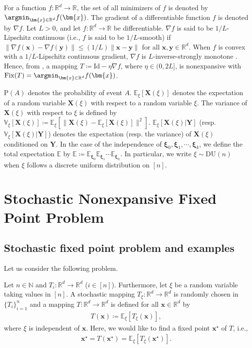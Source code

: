 \documentclass[smallextended,referee,envcountsect,]{svjour3}
\begin{document}
For a function $f \colon \mathbb{R}^d \to \mathbb{R}$, the set of all minimizers of $f$ is denoted by $\argmin_{\bm{x} \in \mathbb{R}^d} f(\bm{x})$. The gradient of a differentiable function $f$ is denoted by $\nabla f$. Let $L > 0$, and let $f \colon \mathbb{R}^d \to \mathbb{R}$ be differentiable. $\nabla f$ is said to be $1/L$-Lipschitz continuous (i.e., $f$ is said to be $1/L$-smooth) if $\|\nabla f (\bm{x}) - \nabla f (\bm{y}) \| \leq (1/L) \| \bm{x} - \bm{y} \|$ for all $\bm{x}, \bm{y} \in \mathbb{R}^d$. When $f$ is convex with a $1/L$-Lipschitz continuous gradient, $\nabla f$ is $L$-inverse-strongly monotone \cite[Th\'{e}or\`{e}me 5]{baillon1977}. Hence, from \cite[Proposition 2.3]{iiduka_JOTA}, a mapping $T \coloneqq \mathrm{Id} - \eta \nabla f$, where $\eta \in (0,2L]$, is nonexpansive with $\mathrm{Fix}(T) = \argmin_{\bm{x} \in \mathbb{R}^d} f(\bm{x})$.

$\mathrm{P}(A)$ denotes the probability of event $A$. $\mathbb{E}_\xi [\bm{X}(\xi)]$ denotes the expectation of a random variable $\bm{X}(\xi)$ with respect to a random variable $\xi$. The variance of $\bm{X}(\xi)$ with respect to $\xi$ is defined by $\mathbb{V}_\xi [\bm{X}(\xi)] \coloneqq \mathbb{E}_\xi [\| \bm{X}(\xi) - \mathbb{E}_\xi [\bm{X}(\xi)] \|^2]$. $\mathbb{E}_\xi [\bm{X}(\xi)|\bm{Y}]$ (resp. $\mathbb{V}_\xi [\bm{X}(\xi)|\bm{Y}]$) denotes the expectation (resp. the variance) of $\bm{X}(\xi)$ conditioned on $\bm{Y}$. In the case of the independence of $\bm{\xi}_0, \bm{\xi}_1, \cdots, \bm{\xi}_k$, we define the total expectation $\mathbb{E}$ by $\mathbb{E} \coloneqq \mathbb{E}_{\bm{\xi}_0} \mathbb{E}_{\bm{\xi}_1} \cdots \mathbb{E}_{\bm{\xi}_k}$. In particular, we write $\xi \sim \mathrm{DU}(n)$ when $\xi$ follows a discrete uniform distribution on $[n]$.

\section{Stochastic Nonexpansive Fixed Point Problem}
\label{sec:2}
\subsection{Stochastic fixed point problem and examples}
Let us consider the following problem.

\begin{problem}\label{prob:1}
Let $n \in \mathbb{N}$ and $T_i \colon \mathbb{R}^d \to \mathbb{R}^d$ ($i\in [n]$). Furthermore, let $\xi$ be a random variable taking values in $[n]$. A stochastic mapping $T_\xi \colon \mathbb{R}^d \to \mathbb{R}^d$ is randomly chosen in $\{ T_i \}_{i=1}^{n}$ and a mapping $T \colon \mathbb{R}^d \to \mathbb{R}^d$ is defined for all $\bm{x} \in \mathbb{R}^d$ by 
\begin{align}\label{true_t}
T (\bm{x}) \coloneqq \mathbb{E}_\xi [T_\xi (\bm{x})],
\end{align}
where $\xi$ is independent of $\bm{x}$.
Here, we would like to find a fixed point $\bm{x}^\star$ of $T$, i.e., 
\begin{align*}
\bm{x}^\star = T (\bm{x}^\star) = \mathbb{E}_\xi [T_\xi (\bm{x}^\star)].
\end{align*} 
\end{problem}
\end{document}
